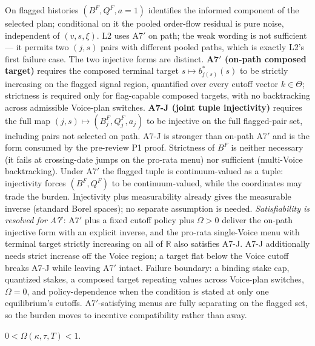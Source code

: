 \documentclass[11pt,a4paper]{article}
\begin{document}
\begin{description}[leftmargin=1.9em,style=unboxed]
\item[A7 / A7$'$ / A7-J Filing sufficiency.] On flagged histories $(B^F,Q^F,a=1)$
  identifies the informed component of the selected plan; conditional on it the
  pooled order-flow residual is pure noise, independent of $(v,s,\xi)$. L2 uses
  A7$'$ on path; the weak wording is not sufficient --- it permits two $(j,s)$ pairs
  with different pooled paths, which is exactly L2's first failure case. The two
  injective forms are distinct. \textbf{A7$'$ (on-path composed target)} requires the
  composed terminal target $s\mapsto b^*_{j(s)}(s)$ to be strictly increasing on the
  flagged signal region, quantified over every cutoff vector $k\in\Theta$; strictness
  is required only for flag-capable composed targets, with no backtracking across
  admissible Voice-plan switches. \textbf{A7-J (joint tuple injectivity)} requires the
  full map $(j,s)\mapsto(B_j^F,Q_j^F,a_j)$ to be injective on the full flagged-pair
  set, including pairs not selected on path. A7-J is stronger than on-path A7$'$ and
  is the form consumed by the pre-review P1 proof. Strictness of $B^F$ is neither
  necessary (it fails at crossing-date jumps on the pro-rata menu) nor sufficient
  (multi-Voice backtracking). Under A7$'$ the flagged tuple is continuum-valued as a
  tuple: injectivity forces $(B^F,Q^F)$ to be continuum-valued, while the coordinates
  may trade the burden. Injectivity plus measurability already gives the measurable
  inverse (standard Borel spaces); no separate assumption is needed.
  \emph{Satisfiability is resolved for A7$'$}: A7$'$ plus a fixed cutoff policy plus
  $\Omega>0$ deliver the on-path injective form with an explicit inverse, and the
  pro-rata single-Voice menu with terminal target strictly increasing on all of
  $\mathbb R$ also satisfies A7-J. A7-J additionally needs strict increase off the
  Voice region; a target flat below the Voice cutoff breaks A7-J while leaving
  A7$'$ intact. Failure boundary: a binding stake cap, quantized stakes, a composed
  target repeating values across Voice-plan switches, $\Omega=0$, and
  policy-dependence when the condition is stated at only one equilibrium's cutoffs.
  A7$'$-satisfying menus are fully separating on the flagged set, so the burden moves
  to incentive compatibility rather than away.

\item[A8 Interior crossing.] $0<\Omega(\kappa,\tau,T)<1$.


\end{description}
\end{document}
